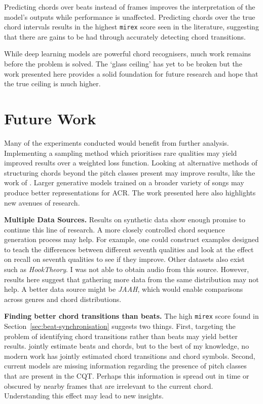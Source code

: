 Predicting chords over beats instead of frames improves the interpretation of the model's outputs while performance is unaffected. Predicting chords over the true chord intervals results in the highest \texttt{mirex} score seen in the literature, suggesting that there are gains to be had through accurately detecting chord transitions.

While deep learning models are powerful chord recognisers, much work remains before the problem is solved. The `glass ceiling' has yet to be broken but the work presented here provides a solid foundation for future research and hope that the true ceiling is much higher.

\section{Future Work}

Many of the experiments conducted would benefit from further analysis. Implementing a sampling method which prioritises rare qualities may yield improved results over a weighted loss function. Looking at alternative methods of structuring chords beyond the pitch classes present may improve results, like the work of \citet{ACRLargeVocab1}. Larger generative models trained on a broader variety of songs may produce better representations for ACR. The work presented here also highlights new avenues of research.

\textbf{Multiple Data Sources.} Results on synthetic data show enough promise to continue this line of research. A more closely controlled chord sequence generation process may help. For example, one could construct examples designed to teach the differences between different seventh qualities and look at the effect on recall on seventh qualities to see if they improve. Other datasets also exist such as \emph{HookTheory}. I was not able to obtain audio from this source. However, results here suggest that gathering more data from the same distribution may not help. A better data source might be \emph{JAAH}, which would enable comparisons across genres and chord distributions.

\textbf{Finding better chord transitions than beats.} The high \texttt{mirex} score found in Section~\ref{sec:beat-synchronisation} suggests two things. First, targeting the problem of identifying chord transitions rather than beats may yield better results. \citet{ChorusAlignmentJAAH} jointly estimate beats and chords, but to the best of my knowledge, no modern work has jointly estimated chord transitions and chord symbols. Second, current models are missing information regarding the presence of pitch classes that are present in the CQT. Perhaps this information is spread out in time or obscured by nearby frames that are irrelevant to the current chord. Understanding this effect may lead to new insights.

